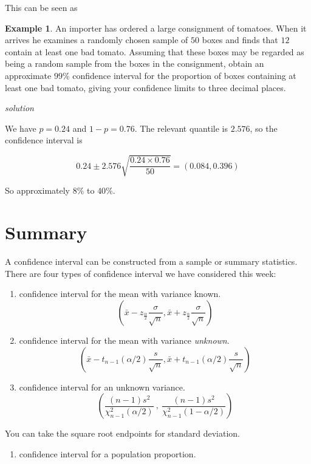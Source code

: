 \documentclass[
]{book}
\providecommand{\tightlist}{%
  \setlength{\itemsep}{0pt}\setlength{\parskip}{0pt}}
\theoremstyle{definition}
\theoremstyle{definition}
\newtheorem{example}{Example}[chapter]
\theoremstyle{definition}
\theoremstyle{definition}
\theoremstyle{remark}
\begin{document}
This can be seen as

\begin{example}
An importer has ordered a large consignment of tomatoes. When it arrives he examines a randomly chosen sample of \(50\) boxes and finds that \(12\) contain at least one bad tomato. Assuming that these boxes may be regarded as being a random sample from the boxes in the consignment, obtain an approximate \(99\%\) confidence interval for the proportion of boxes containing at least one bad tomato, giving your confidence limits to three decimal places.
\end{example}

\emph{solution}

We have \(p=0.24\) and \(1-p = 0.76\). The relevant quantile is \(2.576\), so the confidence interval is

\[0.24 \pm 2.576\sqrt{\frac{0.24\times 0.76}{50}} = (0.084,0.396) \]

So approximately \(8\%\) to \(40\%\).

\hypertarget{summary}{%
\section{Summary}\label{summary}}

A confidence interval can be constructed from a sample or summary statistics. There are four types of confidence interval we have considered this week:

\begin{enumerate}
\def\labelenumi{\arabic{enumi})}
\item
  confidence interval for the mean with variance known.
  \[\left( \bar{x}-z_{\frac{\alpha}{2}}\frac{\sigma}{\sqrt{n}},\bar{x}+z_{\frac{\alpha}{2}}\frac{\sigma}{\sqrt{n}} \right) \]
\item
  confidence interval for the mean with variance \emph{unknown}.
  \[\left( \bar{x} - t_{n-1}(\alpha /2) \frac{s}{\sqrt{n}}, \bar{x} + t_{n-1}(\alpha /2) \frac{s}{\sqrt{n}}\right)  \]
\item
  confidence interval for an unknown variance.
  \[\left( \frac{(n-1)s^2}{\chi^2_{n-1}(\alpha / 2)} \ , \ \frac{(n-1)s^2}{\chi^2_{n-1}(1-\alpha / 2)}\right) \]
\end{enumerate}

You can take the square root endpoints for standard deviation.

\begin{enumerate}
\def\labelenumi{\arabic{enumi})}
\setcounter{enumi}{3}
\tightlist
\item
  confidence interval for a population proportion.
\end{enumerate}
\end{document}
